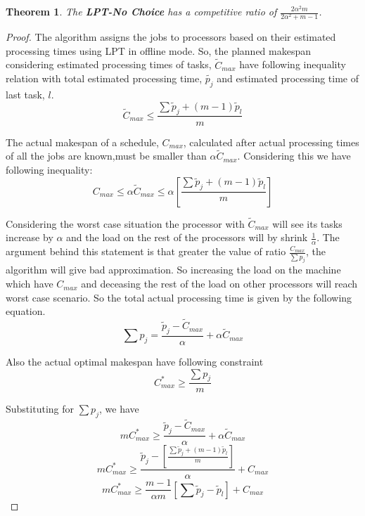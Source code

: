 \documentclass[10pt, conference, compsocconf]{IEEEtran}
\newtheorem{theorem}{Theorem}[section]
\begin{document}
\begin{theorem}
The \textbf{LPT-No Choice} has a competitive ratio of $ \frac{2\alpha^{2}m}{2\alpha^{2}+ m-1}$.
\end{theorem} 

\begin{proof}
  The algorithm assigns the jobs to processors based on their
  estimated processing times using LPT in offline mode. So, the
  planned makespan considering estimated processing times of tasks,
  $\tilde{C}_{max}$ have following inequality relation with total
  estimated processing time, $\tilde{p_j}$ and estimated processing
  time of last task, $l$.
\begin{equation}\label{eq2}
\tilde C_{max}\leq  \frac{\sum{\tilde p_j + (m-1) \tilde p_l} }{m}
\end{equation}

The actual makespan of a schedule, $C_{max}$, calculated after actual
processing times of all the jobs are known,must be smaller than
$\alpha\tilde C_{max}$. Considering this we have following inequality:
\begin{equation}\label{eq3}
  C_{max}\leq \alpha \tilde C_{max}\leq \alpha [\frac{\sum{\tilde p_j + (m-1) \tilde p_l} }{m}] 
\end{equation} 

Considering the worst case situation the processor with $\tilde
C_{max}$ will see its tasks increase by $\alpha$ and the load on the
rest of the processors will by shrink $\frac{1}{\alpha}$.  The
argument behind this statement is that greater the value of ratio
$\frac{C_{max}}{\sum{p_j}}$, the algorithm will give bad
approximation. So increasing the load on the machine which have
$C_{max} $ and deceasing the rest of the load on other processors will
reach worst case scenario. So the total actual processing time is
given by the following equation.
 \begin{equation}\label{eq4}
 \sum {p_j} = \frac{\tilde p_j- \tilde C_{max}}{\alpha} + \alpha \tilde C_{max}
 \end{equation}
 
 Also the actual optimal makespan have following constraint
 \begin{equation}\nonumber 
C_{max}^{*}\geq \frac{\sum {p_j}}{m}
\end{equation}

Substituting for  $ \sum {p_j}$, we have
 \begin{equation}\nonumber 
 m C_{max}^{*}\geq \frac{\tilde p_j- \tilde C_{max}}{\alpha} + \alpha \tilde C_{max}
 \end{equation} 
\begin{equation}\nonumber 
 m C_{max}^{*}\geq \frac{\tilde p_j-[\frac{\sum{\tilde p_j + (m-1) \tilde p_l }}{m}]} {\alpha} + {C_{max}}
\end{equation}
\begin{equation}\nonumber
 m C_{max}^{*}\geq \frac{m-1}{\alpha m} [\sum \tilde p_j-\tilde p_l] + {C_{max}}
 \end{equation}


\end{proof}
\end{document}
